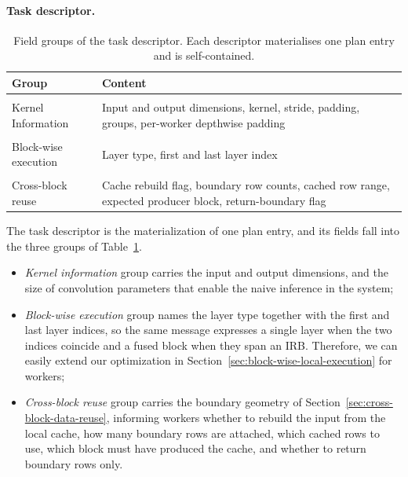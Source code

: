 \paragraph{Task descriptor.}

\begin{table}[t]
\centering
\caption{Field groups of the task descriptor. Each descriptor materialises one plan entry and is self-contained.}
\label{tab:sd-task}
\footnotesize
\setlength{\tabcolsep}{4pt}
\begin{tabular}{l p{8.2cm}}
\hline
\textbf{Group} & \textbf{Content} \\
\hline
\\
Kernel Information & Input and output dimensions, kernel, stride, padding, groups,
per-worker depthwise padding 
\vspace{2mm} \\
\hline
\\
Block-wise execution & Layer type, first and last layer index \vspace{2mm}\\
\hline
\\
Cross-block reuse & Cache rebuild flag, boundary row counts, cached row range,
expected producer block, return-boundary flag \vspace{2mm} \\
\hline
\end{tabular}
\end{table}


The task descriptor is the materialization of one plan entry, and its fields fall into the three groups of Table~\ref{tab:sd-task}.
\begin{itemize}
    \item \emph{Kernel information} group carries the input and output dimensions, and the size of convolution parameters that enable the naive inference in the system;
    \item \emph{Block-wise execution} group names the layer type together with the first and last layer indices, so the same message expresses a single layer when the two indices coincide and a fused block when they span an IRB. Therefore, we can easily extend our optimization in Section~\ref{sec:block-wise-local-execution} for workers;
    \item \emph{Cross-block reuse} group carries the boundary geometry of Section~\ref{sec:cross-block-data-reuse}, informing workers whether to rebuild the input from the local cache, how many boundary rows are attached, which cached rows to use, which block must have produced the cache, and whether to return boundary rows only.
\end{itemize}

